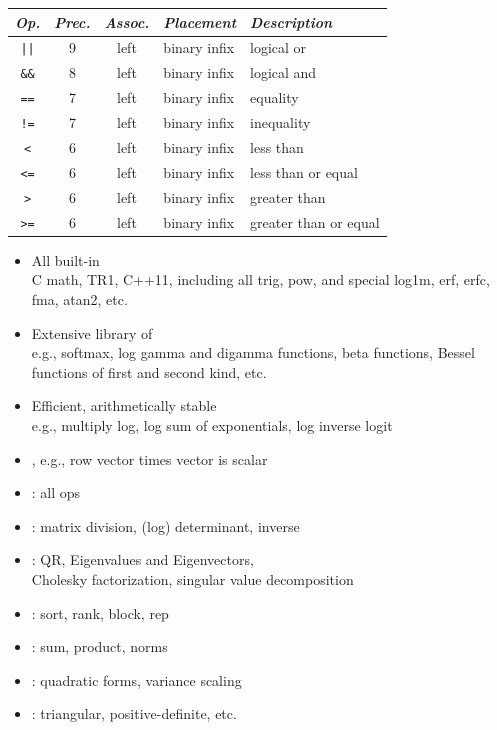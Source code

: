 \documentclass[10pt]{report}
\newcommand{\sld}[1]{\newpage{\noindent\LARGE \ \ \
    \textcolor{MidnightBlue}{\bfseries #1}}\vspace*{4pt}}
\newcommand{\code}[1]{{\tt #1}}
\newcommand{\spc}{\hspace*{0.25in}}
\newcommand{\myemph}[1]{{\color{MidnightBlue}{\bfseries #1}}}
\begin{document}
\sld{Logical Operators}
\vfill
\noindent\spc
{\footnotesize
\begin{tabular}{c|ccl|l}
{\it Op.} & {\it Prec.} & {\it Assoc.} & {\it
  Placement} & {\it Description}
\\ \hline \hline
\code{||} & 9 & left & binary infix & logical or
\\ \hline
\Verb|&&| & 8 & left & binary infix & logical and
\\ \hline
\Verb|==| & 7 & left & binary infix & equality
\\
\Verb|!=| & 7 & left & binary infix & inequality
\\ \hline
\Verb|<| & 6 & left & binary infix & less than
\\
\Verb|<=| & 6 & left & binary infix & less than or equal
\\
\Verb|>| & 6 & left & binary infix & greater than 
\\
\Verb|>=| & 6 & left & binary infix & greater than or equal
\end{tabular}
}
\vfill
\vfill


\sld{Built-in Math Functions}

\begin{itemize}
\item All built-in \myemph{C++ functions and operators}
\\
{\footnotesize C math, TR1, C++11, including all trig, pow, and
  special log1m, erf, erfc, fma, atan2, etc.}
\item Extensive library of \myemph{statistical functions}
\\
{\footnotesize e.g., softmax,
log gamma and digamma functions, beta functions, Bessel functions of
first and second kind, etc.}
%
\item Efficient, arithmetically stable \myemph{compound functions}
\\
{\footnotesize e.g., multiply log, log sum of
exponentials, log inverse logit}
\end{itemize}

\sld{Built-in Matrix Functions}

\begin{itemize}
\item \myemph{Type inference}, {\small e.g., row vector times vector is scalar}
\item \myemph{Basic and elementwise arithmetic}: all ops
\item \myemph{Solvers}: matrix division, (log) determinant,
inverse 
\item \myemph{Decompositions}: QR, Eigenvalues and Eigenvectors, 
\\
Cholesky factorization, singular value decomposition
\item \myemph{Ordering, Slicing, Broadcasting}: sort, rank, block, rep
\item \myemph{Reductions}: sum, product, norms
\item \myemph{Compound Operations}: quadratic forms, variance scaling
\item \myemph{Specializations}: triangular, positive-definite, etc.
\end{itemize}
\end{document}
